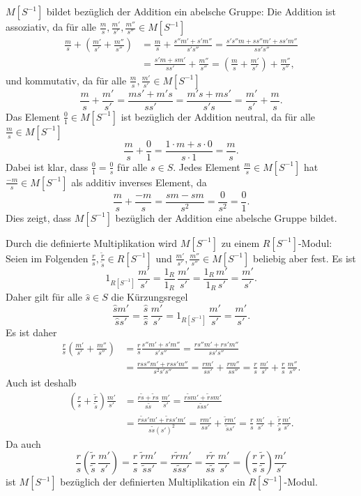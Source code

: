 \documentclass[a4paper,10pt]{article}
\theoremstyle{definition}
\begin{document}
$M[S^{-1}]$ bildet bezüglich der Addition ein abelsche Gruppe: Die Addition ist assoziativ, da für alle $\frac{m}{s}, \frac{m'}{s'}, \frac{m''}{s''} \in M[S^{-1}]$
\begin{align*}
 \frac{m}{s} + \left( \frac{m'}{s'} + \frac{m''}{s''} \right)
 &= \frac{m}{s} + \frac{s''m' + s'm''}{s's''}
 = \frac{s's''m + ss''m' + ss'm''}{ss's''} \\
 &= \frac{s'm + sm'}{ss'} + \frac{m''}{s''}
 = \left( \frac{m}{s} + \frac{m'}{s'} \right) + \frac{m''}{s''},
\end{align*}
und kommutativ, da für alle $\frac{m}{s}, \frac{m'}{s'} \in M[S^{-1}]$
\[
 \frac{m}{s} + \frac{m'}{s'}
 = \frac{ms' + m's}{ss'}
 = \frac{m's + ms'}{s's}
 = \frac{m'}{s'} + \frac{m}{s}.
\]
Das Element $\frac{0}{1} \in M[S^{-1}]$ ist bezüglich der Addition neutral, da für alle $\frac{m}{s} \in M[S^{-1}]$
\[
 \frac{m}{s} + \frac{0}{1} = \frac{1 \cdot m + s \cdot 0}{s \cdot 1} = \frac{m}{s}.
\]
Dabei ist klar, dass $\frac{0}{1} = \frac{0}{s}$ für alle $s \in S$. Jedes Element $\frac{m}{s} \in M[S^{-1}]$ hat $\frac{-m}{s} \in M[S^{-1}]$ als additiv inverses Element, da
\[
 \frac{m}{s} + \frac{-m}{s} = \frac{sm - sm}{s^2} = \frac{0}{s^2} = \frac{0}{1}.
\]
Dies zeigt, dass $M[S^{-1}]$ bezüglich der Addition eine abelsche Gruppe bildet.

Durch die definierte Multiplikation wird $M[S^{-1}]$ zu einem $R[S^{-1}]$-Modul: Seien im Folgenden $\frac{r}{s}, \frac{\tilde{r}}{\tilde{s}} \in R[S^{-1}]$ und $\frac{m'}{s'}, \frac{m''}{s''} \in M[S^{-1}]$  beliebig aber fest. Es ist
\[
 1_{R[S^{-1}]} \,\frac{m'}{s'}
 = \frac{1_R}{1_R} \, \frac{m'}{s'}
 = \frac{1_R \, m'}{1_R \, s'}
 = \frac{m'}{s'}.
\]
Daher gilt für alle $\hat{s} \in S$ die Kürzungsregel
\[
 \frac{\hat{s}m'}{\hat{s}s'}
 = \frac{\hat{s}}{\hat{s}} \, \frac{m'}{s'}
 = 1_{R[S^{-1}]} \, \frac{m'}{s'}
 = \frac{m'}{s'}.
\]
Es ist daher
\begin{align*}
 \frac{r}{s} \left( \frac{m'}{s'} + \frac{m''}{s''} \right)
 &= \frac{r}{s} \frac{s''m' + s'm''}{s's''}
 = \frac{rs''m' + rs'm''}{ss's''} \\
 &= \frac{rss''m' + rss'm''}{s^2s's''}
 = \frac{rm'}{ss'} + \frac{rm''}{ss''}
 = \frac{r}{s} \, \frac{m'}{s'} + \frac{r}{s} \, \frac{m''}{s''}.
\end{align*}
Auch ist deshalb
\begin{align*}
 \left(\frac{r}{s} + \frac{\tilde{r}}{\tilde{s}}\right) \frac{m'}{s'}
 &= \frac{r\tilde{s}+\tilde{r}s}{s\tilde{s}} \, \frac{m'}{s'}
 = \frac{r\tilde{s}m' + \tilde{r}sm'}{s\tilde{s}s'} \\
 &= \frac{r\tilde{s}s'm' + \tilde{r}ss'm'}{s\tilde{s}(s')^2}
 = \frac{rm'}{ss'} + \frac{\tilde{r}m'}{\tilde{s}s'}
 = \frac{r}{s} \, \frac{m'}{s'} + \frac{\tilde{r}}{\tilde{s}} \frac{m'}{s'}.
\end{align*}
Da auch
\[
 \frac{r}{s} \left(\frac{\tilde{r}}{\tilde{s}} \, \frac{m'}{s'}\right)
 = \frac{r}{s} \, \frac{\tilde{r} m'}{\tilde{s} s'}
 = \frac{r \tilde{r} m'}{s \tilde{s} s'}
 = \frac{r \tilde{r}}{s \tilde{s}} \, \frac{m'}{s'}
 = \left( \frac{r}{s} \, \frac{\tilde{r}}{\tilde{s}} \right) \frac{m'}{s'}
\]
ist $M[S^{-1}]$ bezüglich der definierten Multiplikation ein $R[S^{-1}]$-Modul.
\end{document}

